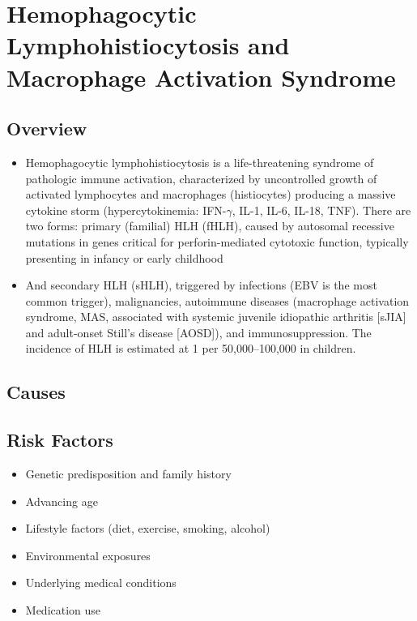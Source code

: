 \chapter{Hemophagocytic Lymphohistiocytosis and Macrophage Activation Syndrome}
\label{sec:Hemophagocytic Lymphohistiocytosis (HLH)}

\section{Overview}


\begin{itemize}[noitemsep]
  \item Hemophagocytic lymphohistiocytosis is a life-threatening syndrome of pathologic immune activation, characterized by uncontrolled growth of activated lymphocytes and macrophages (histiocytes) producing a massive cytokine storm (hypercytokinemia: IFN-$\gamma$, IL-1, IL-6, IL-18, TNF). There are two forms: primary (familial) HLH (fHLH), caused by autosomal recessive mutations in genes critical for perforin-mediated cytotoxic function, typically presenting in infancy or early childhood
  \item And secondary HLH (sHLH), triggered by infections (EBV is the most common trigger), malignancies, autoimmune diseases (macrophage activation syndrome, MAS, associated with systemic juvenile idiopathic arthritis [sJIA] and adult-onset Still's disease [AOSD]), and immunosuppression. The incidence of HLH is estimated at 1 per 50,000--100,000 in children.
\end{itemize}
\section{Causes}
\section{Risk Factors}

\begin{itemize}[noitemsep]
  \item Genetic predisposition and family history
  \item Advancing age
  \item Lifestyle factors (diet, exercise, smoking, alcohol)
  \item Environmental exposures
  \item Underlying medical conditions
  \item Medication use
\end{itemize}

